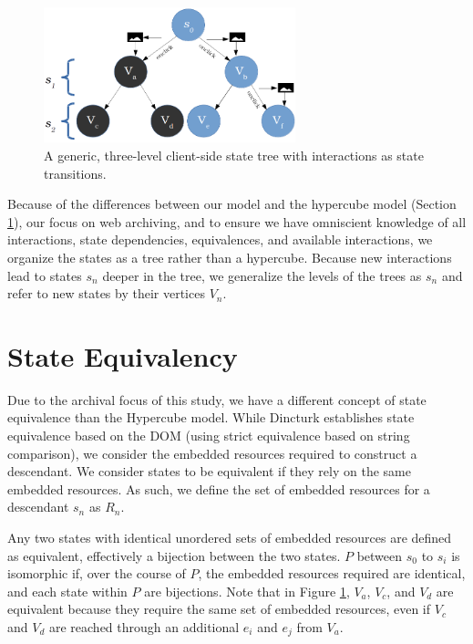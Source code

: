\documentclass{sig-alternate}
\begin{document}
\begin{figure}[hT]
\centering
    \includegraphics[width=0.65\textwidth]{./imgs/state_diagram_www.png}
  \caption{A generic, three-level client-side state tree with interactions as state transitions.}
\label{diagram}
\end{figure}

Because of the differences between our model and the hypercube model (Section \ref{paths}), our focus on web archiving, and to ensure we have omniscient knowledge of all interactions, state dependencies, equivalences, and available interactions, we organize the states as a tree rather than a hypercube. Because new interactions lead to states $s_n$ deeper in the tree, we generalize the levels of the trees as $s_n$ and refer to new states by their vertices $V_n$.




\section{State Equivalency}
\label{paths}
Due to the archival focus of this study, we have a different concept of state equivalence than the Hypercube model. While Dincturk establishes state equivalence based on the DOM (using strict equivalence based on string comparison), we consider the embedded resources required to construct a descendant. We consider states to be equivalent if they rely on the same embedded resources. As such, we define the set of embedded resources for a descendant $s_n$ as $R_n$. 

Any two states with identical unordered sets of embedded resources are defined as equivalent, effectively a bijection between the two states. $P$ between $s_0$ to $s_i$ is isomorphic if, over the course of $P$, the embedded resources required are identical, and each state within $P$ are bijections. Note that in Figure \ref{diagram}, $V_a$, $V_c$, and $V_d$ are equivalent because they require the same set of embedded resources, even if $V_c$ and $V_d$ are reached through an additional $e_i$ and $e_j$ from $V_a$.
\end{document}
